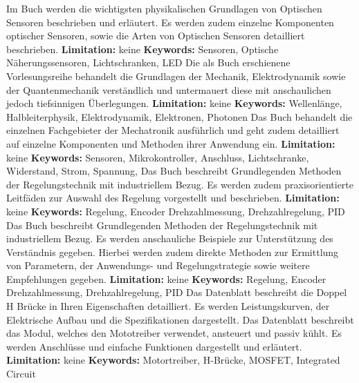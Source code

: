 { 
	Im Buch \cite{Loeffler-Mang:2012} werden die wichtigsten physikalischen Grundlagen von Optischen Sensoren beschrieben und erläutert.  Es werden zudem einzelne Komponenten optischer Sensoren, sowie die Arten von Optischen Sensoren detailliert beschrieben. 
	\textbf{Limitation:} keine 
	\scriptsize{\textbf{Keywords:}  Sensoren, Optische Näherungssensoren, Lichtschranken, LED}
}  
{ 
	Die als Buch erschienene Vorlesungsreihe \cite{Feynman:2020} behandelt die Grundlagen der Mechanik, Elektrodynamik sowie der Quantenmechanik verständlich und untermauert diese mit anschaulichen jedoch tiefsinnigen Überlegungen. 
	\textbf{Limitation:} keine 
	\scriptsize{\textbf{Keywords:}  Wellenlänge, Halbleiterphysik, Elektrodynamik, Elektronen, Photonen}
}  
{ 
	Das Buch \cite{Roddeck:2023} behandelt die einzelnen Fachgebieter der Mechatronik ausführlich und geht zudem detailliert auf einzelne Komponenten und Methoden ihrer Anwendung ein. 
	\textbf{Limitation:} keine 
	\scriptsize{\textbf{Keywords:}  Sensoren, Mikrokontroller, Anschluss, Lichtschranke, Widerstand, Strom, Spannung, }
}  
{ 
	Das Buch \cite{Lunze:2020} beschreibt Grundlegenden Methoden der Regelungstechnik mit industriellem Bezug. Es werden zudem praxisorientierte Leitfäden zur Auswahl des Regelung vorgestellt und beschrieben. 
	\textbf{Limitation:} keine 
	\scriptsize{\textbf{Keywords:}  Regelung, Encoder Drehzahlmessung, Drehzahlregelung, PID }
}  
{ 
	Das Buch \cite{Loose:2026} beschreibt Grundlegenden Methoden der Regelungstechnik mit industriellem Bezug. Es werden anschauliche Beispiele zur Unterstützung des Verständnis gegeben. Hierbei werden zudem direkte Methoden zur Ermittlung von Parametern, der Anwendungs- und Regelungstrategie sowie weitere Empfehlungen gegeben.  
	\textbf{Limitation:} keine 
	\scriptsize{\textbf{Keywords:}  Regelung, Encoder Drehzahlmessung, Drehzahlregelung, PID }
}  
{ 
	Das Datenblatt \cite{Infineon:2004} beschreibt die Doppel H Brücke  in Ihren Eigenschaften detailliert. Es werden Leistungskurven, der Elektrische Aufbau und die Spezifikationen dargestellt. 
	Das Datenblatt \cite{anzado:2026}beschreibt das Modul, welches den Mototreiber verwendet, ansteuert und passiv kühlt. Es werden Anschlüsse und einfache Funktionen dargestellt und erläutert. \\ 
	
	\textbf{Limitation:} keine 
	\scriptsize{\textbf{Keywords:}  Motortreiber, H-Brücke, MOSFET, Integrated Circuit}
}  

